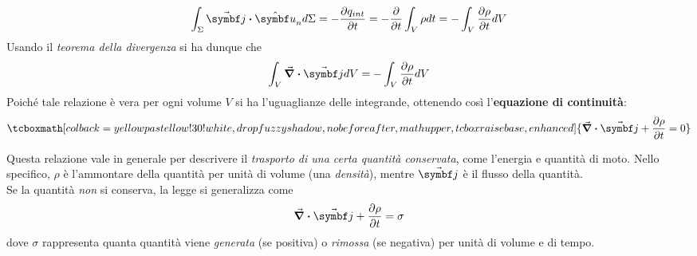 \begin{equation*}
	\int_{\Sigma}\vba{j}\vdot\vbh{u}_nd\Sigma=-\pdv{q_{int}}{t}=-\pdv{t}\int_V\rho dt=-\int_V\pdv{\rho}{t} dV
\end{equation*}
Usando il \textit{teorema della divergenza} si ha dunque che
\begin{equation*}
	\int_V\div{\vba{j}}dV=-\int_V\pdv{\rho}{t} dV
\end{equation*}
Poiché tale relazione è vera per ogni volume $V$ si ha l'uguaglianze delle integrande, ottenendo così l'\textbf{equazione di continuità}:
\begin{equation}
	\tcboxmath[colback=yellowpastellow!30!white,drop fuzzy shadow, nobeforeafter, math upper, tcbox raise base, enhanced]{\div{\vba{j}}+\pdv{\rho}{t}=0}
\end{equation}
\begin{digression}
	Questa relazione vale in generale per descrivere il \textit{trasporto di una certa quantità conservata}, come l'energia e quantità di moto.
	Nello specifico, $\rho$ è l'ammontare della quantità per unità di volume (una \textit{densità}), mentre $\vba{j}$ è il flusso della quantità.\\
	Se la quantità \textit{non} si conserva, la legge si generalizza come
	\begin{equation}
		\div{\vba{j}}+\pdv{\rho}{t}=\sigma
	\end{equation}
dove $\sigma$ rappresenta quanta quantità viene \textit{generata} (se positiva) o \textit{rimossa} (se negativa) per unità di volume e di tempo.
\end{digression}
